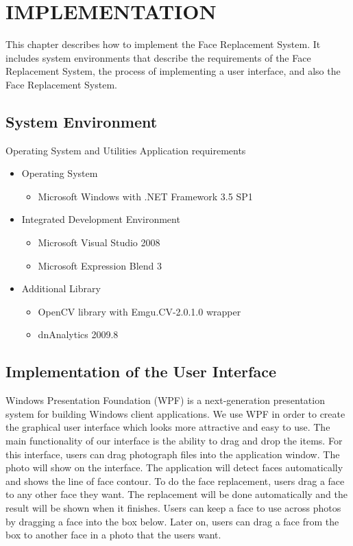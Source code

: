 \chapter{IMPLEMENTATION}\label{chap:IMPLEMENTATION}

\hspace{0.5in}This chapter describes how to implement the Face Replacement System. It includes system environments that describe the requirements of the Face Replacement System, the process of implementing a user interface, and also the Face Replacement System.

\section{System Environment}
Operating System and Utilities Application requirements
\begin{itemize}
\item Operating System
    \begin{itemize}
    \item Microsoft Windows with .NET Framework 3.5 SP1
    \end{itemize}
\item Integrated Development Environment
    \begin{itemize}
    \item Microsoft Visual Studio 2008
    \item Microsoft Expression Blend 3
    \end{itemize}
\item Additional Library
    \begin{itemize}
    \item OpenCV library with Emgu.CV-2.0.1.0 wrapper
    \item dnAnalytics 2009.8
    \end{itemize}
\end{itemize}


\section{Implementation of the User Interface}
\hspace{0.5in}Windows Presentation Foundation (WPF) is a next-generation presentation system for building Windows client applications. We use WPF in order to create the graphical user interface which looks more attractive and easy to use. The main functionality of our interface is the ability to drag and drop the items. For this interface, users can drag photograph files into the application window. The photo will show on the interface. The application will detect faces automatically and shows the  line of face contour. To do the face replacement, users drag a face to any other face they want. The replacement will be done automatically and the result will be shown when it finishes. Users can keep a face to use across photos by dragging a face into the box below. Later on, users can drag a face from the box to another face in a photo that the users want.

